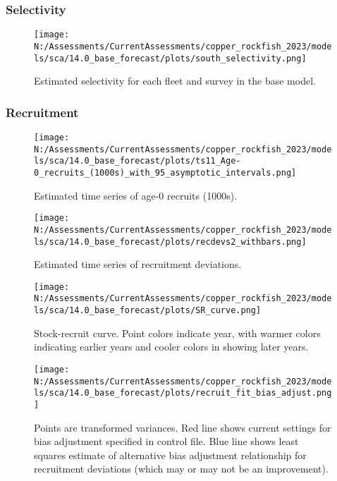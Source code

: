 \documentclass[11pt,
  english,
  letterpaper,
]{article}
\begin{document}
\pagebreak

\hypertarget{selectivity}{%
\subsubsection{Selectivity}\label{selectivity}}

\begin{figure}
\centering
\texttt{[image: N:/Assessments/CurrentAssessments/copper\_rockfish\_2023/models/sca/14.0\_base\_forecast/plots/south\_selectivity.png]}
\caption{Estimated selectivity for each fleet and survey in the base model.\label{fig:est-selex}}
\end{figure}

\newpage

\hypertarget{recruitment-1}{%
\subsubsection{Recruitment}\label{recruitment-1}}

\begin{figure}
\centering
\texttt{[image: N:/Assessments/CurrentAssessments/copper\_rockfish\_2023/models/sca/14.0\_base\_forecast/plots/ts11\_Age-0\_recruits\_(1000s)\_with\_95\_asymptotic\_intervals.png]}
\caption{Estimated time series of age-0 recruits (1000s).\label{fig:recruits}}
\end{figure}

\pagebreak

\begin{figure}
\centering
\texttt{[image: N:/Assessments/CurrentAssessments/copper\_rockfish\_2023/models/sca/14.0\_base\_forecast/plots/recdevs2\_withbars.png]}
\caption{Estimated time series of recruitment deviations.\label{fig:rec-devs}}
\end{figure}

\pagebreak

\begin{figure}
\centering
\texttt{[image: N:/Assessments/CurrentAssessments/copper\_rockfish\_2023/models/sca/14.0\_base\_forecast/plots/SR\_curve.png]}
\caption{Stock-recruit curve. Point colors indicate year, with warmer colors indicating earlier years and cooler colors in showing later years.\label{fig:bh-curve}}
\end{figure}

\pagebreak

\begin{figure}
\centering
\texttt{[image: N:/Assessments/CurrentAssessments/copper\_rockfish\_2023/models/sca/14.0\_base\_forecast/plots/recruit\_fit\_bias\_adjust.png]}
\caption{Points are transformed variances. Red line shows current settings for bias adjustment specified in control file. Blue line shows least squares estimate of alternative bias adjustment relationship for recruitment deviations (which may or may not be an improvement).\label{fig:bias-adjust}}
\end{figure}
\end{document}
